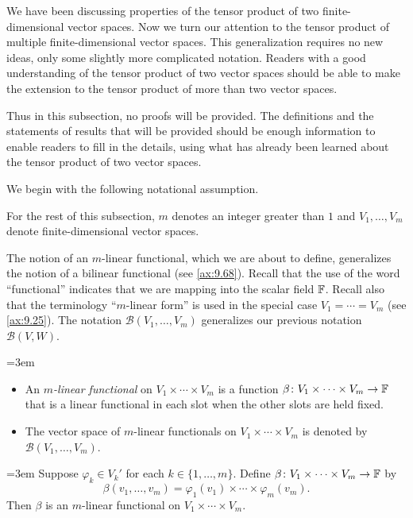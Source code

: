 We have been discussing properties of the tensor product of two
finite-dimensional vector spaces. Now we turn our attention to the tensor
product of multiple finite-dimensional vector spaces. This generalization
requires no new ideas, only some slightly more complicated notation. Readers
with a good understanding of the tensor product of two vector spaces should be
able to make the extension to the tensor product of more than two vector
spaces.

Thus in this subsection, no proofs will be provided. The definitions and the
statements of results that will be provided should be enough information to
enable readers to fill in the details, using what has already been learned
about the tensor product of two vector spaces.

We begin with the following notational assumption.

\begin{notation}[$V_1,\dots,V_m$]\label{ax:9.84}
For the rest of this subsection, $m$ denotes an integer greater than $1$ and
$V_1,\dots,V_m$ denote finite-dimensional vector spaces.
\end{notation}

The notion of an $m$-linear functional, which we are about to define,
generalizes the notion of a bilinear functional (see \ref{ax:9.68}). Recall
that the use of the word ``functional'' indicates that we are mapping into the
scalar field $\mathbb{F}$. Recall also that the terminology ``$m$-linear form'' is used
in the special case $V_1=\cdots=V_m$ (see \ref{ax:9.25}). The notation
$\mathcal{B}(V_1,\dots,V_m)$ generalizes our previous notation
$\mathcal{B}(V,W)$.

\begin{definition}\label{ax:9.85}\leavevmode\emergencystretch=3em
\begin{itemize}
\item An \emph{$m$-linear functional} on $V_1\times\cdots\times V_m$ is a
  function $\beta\colon V_1\times\cdots\times V_m\to\mathbb{F}$ that is a linear
  functional in each slot when the other slots are held fixed.
\item The vector space of $m$-linear functionals on $V_1\times\cdots\times V_m$
  is denoted by $\mathcal{B}(V_1,\dots,V_m)$.
\end{itemize}
\end{definition}

\begin{example}\label{ax:9.86}\emergencystretch=3em
Suppose $\varphi_k\in V_k{}'$ for each $k\in\{1,\dots,m\}$. Define
$\beta\colon V_1\times\cdots\times V_m\to\mathbb{F}$ by
\[ \beta(v_1,\dots,v_m) = \varphi_1(v_1)\times\cdots\times\varphi_m(v_m). \]
Then $\beta$ is an $m$-linear functional on $V_1\times\cdots\times V_m$.
\end{example}

